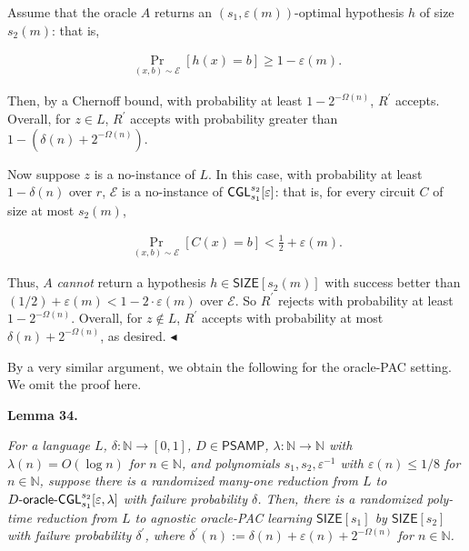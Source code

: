 Assume that the oracle $A$ returns an $(s_{1},\varepsilon(m))$-optimal hypothesis $h$ of size $s_{2}(m)$: that is,\par


\[\begin{gathered}
\Pr_{(x,b)\sim\mathcal{E}}[h(x)=b]\geq 1-\varepsilon(m).
\end{gathered}\]


Then, by a Chernoff bound, with probability at least $1-2^{-\Omega(n)}$, $R^{\prime}$ accepts. Overall, for $z\in L$, $R^{\prime}$ accepts with probability greater than $1-(\delta(n)+2^{-\Omega(n)})$.\par




Now suppose $z$ is a no-instance of $L$. In this case, with probability at least $1-\delta(n)$ over $r$, $\mathcal{E}$ is a no-instance of ${\sf CGL}_{s_{1}}^{s_{2}}[\varepsilon]$: that is, for every circuit $C$ of size at most $s_{2}(m)$,\par


\[\begin{gathered}
\Pr_{(x,b)\sim\mathcal{E}}[C(x)=b]<\frac{1}{2}+\varepsilon(m).
\end{gathered}\]


Thus, $A$ \emph{cannot} return a hypothesis $h\in{\mathsf{SIZE}}[s_{2}(m)]$ with success better than $(1/2)+\varepsilon(m)<1-2\cdot\varepsilon(m)$ over $\mathcal{E}$. So $R^{\prime}$ rejects with probability at least $1-2^{-\Omega(n)}$. Overall, for $z\notin L$, $R^{\prime}$ accepts with probability at most $\delta(n)+2^{-\Omega(n)}$, as desired.
$\blacktriangleleft$\par




By a very similar argument, we obtain the following for the oracle-PAC setting. We omit the proof here.\par





\par\medskip\noindent\textbf{
\textbf{Lemma 34}\textbf{.}
}\par



\emph{For a language $L$, $\delta:\mathbb{N}\to[0,1]$, $D\in{\mathsf{P}}{\mathsf{SAMP}}$, $\lambda:\mathbb{N}\to\mathbb{N}$ with $\lambda(n)=O(\log n)$ for $n\in\mathbb{N}$, and polynomials $s_{1},s_{2},\varepsilon^{-1}$ with $\varepsilon(n)\leq 1/8$ for $n\in\mathbb{N}$, suppose there is a randomized many-one reduction from $L$ to $D\text{-}{\sf oracle}\text{-}{\sf CGL}_{s_{1}}^{s_{2}}[\varepsilon,\lambda]$ with failure probability $\delta$. Then, there is a randomized poly-time reduction from $L$ to agnostic oracle-PAC learning ${\mathsf{SIZE}}[s_{1}]$ by ${\mathsf{SIZE}}[s_{2}]$ with failure probability $\delta^{\prime}$, where $\delta^{\prime}(n):=\delta(n)+\varepsilon(n)+2^{-\Omega(n)}$ for $n\in\mathbb{N}$.}\par



